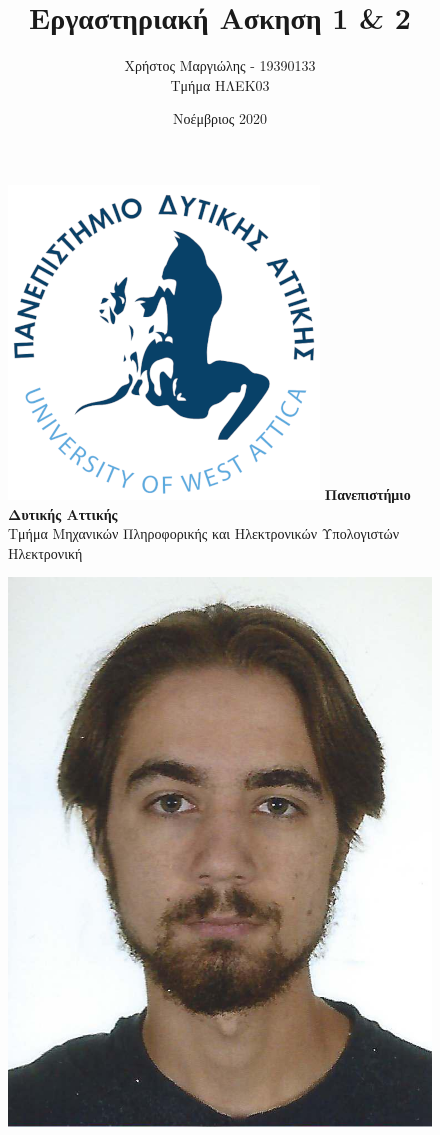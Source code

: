 \documentclass{article}
\title{Εργαστηριακή Ασκηση 1 \& 2}
\author{Χρήστος Μαργιώλης - 19390133 \\ Τμήμα ΗΛΕΚ03}
\date{Νοέμβριος 2020}
\begin{document}
\begin{figure}[t!]
        \centering
        \includegraphics[scale=0.3, center]{./res/Logo_University_of_West_Attica.png}
        \Large
        \textbf{Πανεπιστήμιο Δυτικής Αττικής} \\
        \large
        Τμήμα Μηχανικών Πληροφορικής και Ηλεκτρονικών Υπολογιστών \\
        Ηλεκτρονική
\end{figure}
\begin{figure}[b]
        \centering
        \includegraphics[scale=1]{./res/19390133.jpeg}
\end{figure}
\end{document}

